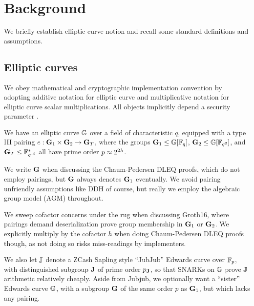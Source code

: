 
\section{Background}
\label{sec:background}

We briefly establish elliptic curve notion and recall some standard
definitions and assumptions.



\subsection{Elliptic curves}
\label{sec:ec_background}


We obey mathematical and cryptographic implementation convention by 
adopting additive notation for elliptic curve and multiplicative notation
for elliptic curve scalar multiplications.
%
All objects implicitly depend a security parameter \secparam.

We have an elliptic curve ${\mathbb{G}}$ over a field of characteristic $q$,
equipped with a type III pairing $e : {\mathbf{G}}_1 \times {\mathbf{G}}_2 \to {\mathbf{G}}_T$,
where the groups  ${\mathbf{G}}_1 \le {\mathbb{G}}[\mathbb{F}_q]$, ${\mathbf{G}}_2 \le {\mathbb{G}}[\mathbb{F}_{q^2}]$, and
${\mathbf{G}}_T \le \mathbb{F}^*_{q^{12}}$ all have prime order $p \approx 2^{2\lambda}$.

We write ${\mathbf{G}}$ when discussing the Chaum-Pedersen DLEQ proofs, which do
not employ pairings, but ${\mathbf{G}}$ always denotes ${\mathbf{G}}_1$ eventually.
We avoid pairing unfriendly assumptions like DDH of course, but really
we employ the algebraic group model (AGM) throughout.

We sweep cofactor concerns under the rug when discussing Groth16,
where pairings demand deserialization prove group membership in ${\mathbf{G}}_1$
or ${\mathbf{G}}_2$.  We explicitly multiply by the cofactor $h$ when doing
Chaum-Pedersen DLEQ proofs though, as not doing so risks miss-readings by implementers.

We also let ${\mathbb{J}}$ denote a ZCash Sapling style ``JubJub'' Edwards curve
over $\mathbb{F}_p$, with distinguished subgroup ${\mathbf{J}}$ of prime order $p_{\mathbf{J}}$, so that
SNARKs on ${\mathbb{G}}$ prove ${\mathbf{J}}$ arithmetic relatively cheaply.
Aside from Jubjub, we optionally want a ``sister'' Edwards curve ${\mathbb{G}}$,
with a subgroup ${\mathbf{G}}$ of the same order $p$ as ${\mathbf{G}}_1$,
 but which lacks any pairing.

